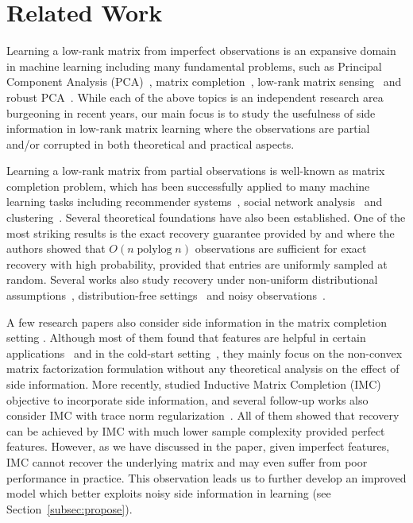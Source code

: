 \documentclass[twoside,11pt]{article}
\newcommand\polylog[1]{\operatorname{polylog}{#1}}
\begin{document}
\section{Related Work}
\label{sec:related}
Learning a low-rank matrix from imperfect observations is an expansive domain in machine learning
including many fundamental problems, such as Principal
Component Analysis (PCA)~\citep{Harold33a}, matrix completion~\citep{Candes09a}, low-rank matrix
sensing~\citep{Zhong15a} and robust PCA~\citep{Wright09a}.  While each of the above topics
is an independent research area burgeoning in recent years, our main focus is to
study the usefulness of side information in low-rank matrix learning where
the observations are partial and/or corrupted in both theoretical and practical
aspects.

Learning a low-rank matrix from partial observations is well-known as
matrix completion problem, which has been successfully applied
to many machine learning tasks including recommender systems~\citep{Koren09a},
social network analysis~\citep{Hsieh12a, Chiang14a} and clustering~\citep{Chen14a}.
Several theoretical foundations have also been established.
One of the most striking results is the exact recovery guarantee provided by
\citet{Candes09a} and \citet{Candes12a}
where the authors showed that $O(n\polylog{n})$ observations are sufficient
for exact recovery with high probability,
provided that entries are uniformly sampled at random.  Several works also study
recovery under non-uniform distributional assumptions~\citep{SN12a},
distribution-free settings~\citep{Shamir14a} and noisy observations~\citep{RK10a, EC10b}.

A few research papers also consider side information in the matrix completion setting
\citep{Menon11a, Chen12a, Natarajan14a, Shin15a}.
Although most of them found that features are helpful
in certain applications~\citep{Menon11a, Shin15a}
and in the cold-start setting~\citep{Natarajan14a},
they mainly focus on the non-convex matrix factorization formulation
without any theoretical analysis on the effect of side information.
More recently, \citet{Jain13a} studied Inductive Matrix Completion (IMC) objective
to incorporate side information, and several follow-up works also
consider IMC with trace norm regularization~\citep{Xu13a, Zhong15a}.
All of them showed that recovery can be achieved by IMC with much lower sample complexity
provided perfect features.
However, as we have discussed in the paper, given imperfect features, IMC cannot recover the underlying matrix and
may even suffer from poor performance in practice.  This observation leads us to further
develop an improved model which better exploits noisy side information in learning
(see Section~\ref{subsec:propose}).
\end{document}
